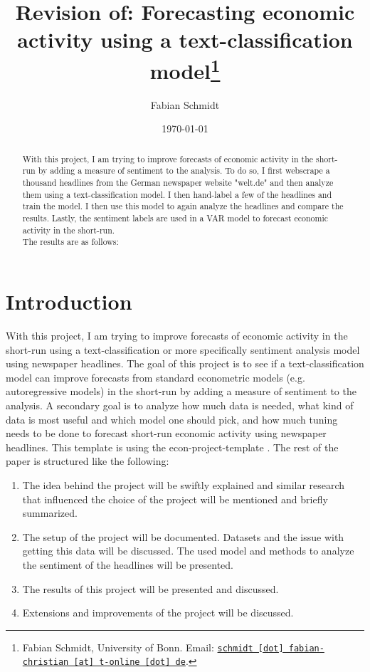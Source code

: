 \documentclass[11pt, a4paper, leqno]{article}
\begin{document}
\title{Revision of: Forecasting economic activity using a text-classification model\thanks{Fabian Schmidt, University of Bonn. Email: \href{mailto:schmidt.fabian-christian@t-online.de}{\nolinkurl{schmidt [dot] fabian-christian [at] t-online [dot] de}}.}}

\author{Fabian Schmidt}

\date{
    \today
}

\maketitle


\begin{abstract}
    With this project, I am trying to improve forecasts of economic activity in the short-run by adding a measure of sentiment to the analysis. To do so, I first webscrape a thousand headlines from the German newspaper website "welt.de" and then analyze them using a text-classification model.
    I then hand-label a few of the headlines and train the model. I then use this model to again analyze the headlines and compare the results. Lastly, the sentiment labels are used in a VAR model to forecast economic activity in the short-run.\\
    The results are as follows:
\end{abstract}

\clearpage


\section{Introduction} %
\label{sec:introduction}

With this project, I am trying to improve forecasts of economic activity in the short-run using a text-classification or more specifically sentiment analysis model using newspaper headlines. The goal of this project is to see if a text-classification model can improve forecasts from standard econometric models (e.g. autoregressive models) in the short-run by adding a measure of sentiment to the analysis.
A secondary goal is to analyze how much data is needed, what kind of data is most useful and which model one should pick, and how much tuning needs to be done to forecast short-run economic activity using newspaper headlines.
This template is using the econ-project-template \citet{Gaudecker2023}.
The rest of the paper is structured like the following:
\begin{enumerate}
    \item The idea behind the project will be swiftly explained and similar research that influenced the choice of the project will be mentioned and briefly summarized.
    \item The setup of the project will be documented. Datasets and the issue with getting this data will be discussed. The used model and methods to analyze the sentiment of the headlines will be presented.
    \item The results of this project will be presented and discussed.
    \item Extensions and improvements of the project will be discussed.
\end{enumerate}
\end{document}
